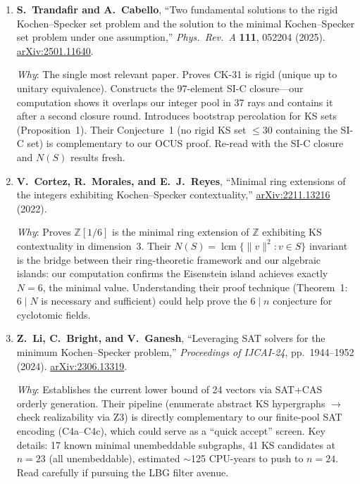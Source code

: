 \documentclass[11pt,a4paper]{article}
\begin{document}
\begin{enumerate}[label=\textbf{\arabic*.}, leftmargin=2em]

\item \textbf{S.~Trandafir and A.~Cabello},
``Two fundamental solutions to the rigid Kochen--Specker set problem and the solution to the minimal Kochen--Specker set problem under one assumption,''
\textit{Phys.\ Rev.\ A} \textbf{111}, 052204 (2025).
\href{https://arxiv.org/abs/2501.11640}{arXiv:2501.11640}.

\smallskip\noindent
\textit{Why}: The single most relevant paper.  Proves CK-31 is rigid (unique up to unitary equivalence).  Constructs the 97-element SI-C closure---our computation shows it overlaps our integer pool in 37 rays and contains it after a second closure round.  Introduces bootstrap percolation for KS sets (Proposition~1).  Their Conjecture~1 (no rigid KS set $\leq 30$ containing the SI-C set) is complementary to our OCUS proof.  Re-read with the SI-C closure and $N(S)$ results fresh.

\bigskip

\item \textbf{V.~Cortez, R.~Morales, and E.~J.~Reyes},
``Minimal ring extensions of the integers exhibiting Kochen--Specker contextuality,''
\href{https://arxiv.org/abs/2211.13216}{arXiv:2211.13216} (2022).

\smallskip\noindent
\textit{Why}: Proves $\mathbb{Z}[1/6]$ is the minimal ring extension of $\mathbb{Z}$ exhibiting KS contextuality in dimension~3.  Their $N(S) = \operatorname{lcm}\{\|v\|^2 : v \in S\}$ invariant is the bridge between their ring-theoretic framework and our algebraic islands: our computation confirms the Eisenstein island achieves exactly $N = 6$, the minimal value.  Understanding their proof technique (Theorem~1: $6 \mid N$ is necessary and sufficient) could help prove the $6 \mid n$ conjecture for cyclotomic fields.

\bigskip

\item \textbf{Z.~Li, C.~Bright, and V.~Ganesh},
``Leveraging SAT solvers for the minimum Kochen--Specker problem,''
\textit{Proceedings of IJCAI-24}, pp.~1944--1952 (2024).
\href{https://arxiv.org/abs/2306.13319}{arXiv:2306.13319}.

\smallskip\noindent
\textit{Why}: Establishes the current lower bound of 24 vectors via SAT+CAS orderly generation.  Their pipeline (enumerate abstract KS hypergraphs $\to$ check realizability via Z3) is directly complementary to our finite-pool SAT encoding (C4a--C4c), which could serve as a ``quick accept'' screen.  Key details: 17 known minimal unembeddable subgraphs, 41 KS candidates at $n = 23$ (all unembeddable), estimated $\sim$125 CPU-years to push to $n = 24$.  Read carefully if pursuing the LBG filter avenue.


\end{enumerate}
\end{document}
